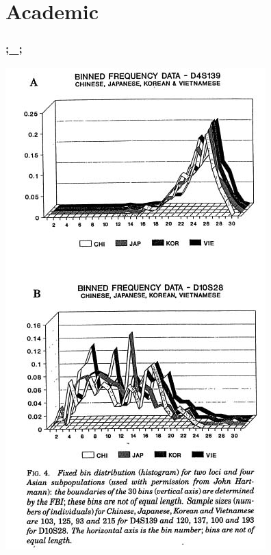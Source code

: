 \documentclass{beamer}
\begin{document}
\section{Academic}
\begin{frame}
  \frametitle{;\_;}
  \begin{center}
    \includegraphics[height = 0.8\textheight, keepaspectratio = true]{figure/roeder_fig4}
  \end{center}
\end{frame}
\end{document}
